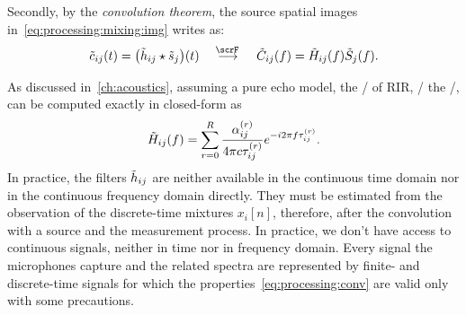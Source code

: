 Secondly, by the \textit{convolution theorem}, the source spatial images in~\cref{eq:processing:mixing:img} writes as:
\begin{equation}\label{eq:processing:conv}
    \tilde{\img}_{\idxMicSrc}( t) =  \kparen{\tilde{\rir}_{\idxMicSrc} \convCont \tilde{\src}_\idxSrc} ( t)
    \mathspace\overset{\fourierTrans{}}{\kto}\mathspace
    \tilde{\IMG}_{\idxMicSrc}( f) =  \tilde{H}_{\idxMicSrc}( f) \tilde{S}_\idxSrc( f)
    .
\end{equation}

\mynewline
As discussed in~\cref{ch:acoustics}, assuming a pure echo model, the \FT/ of \ac{RIR}, \aka/ the \RTFdef/, can be computed exactly in closed-form as
\begin{equation}\label{eq:processing:rir:ft}
    \tilde{H}_{ij}( f) = \sum_{r=0}^{R}
                                 \frac{\alpha_{ij}^{(r)}}{4 \pi c \tau_{ij}^{(r)}}
                                 {e}^{- {i} 2 \pi f \tau_{ij}^{(r)}}
    .
\end{equation}
In practice, the filters $\tilde{h}_{ij}$ are neither available in the continuous time domain nor in the continuous frequency domain directly.
They must be estimated from the observation of the discrete-time mixtures $x_i[n]$, therefore, after the convolution with a source and the measurement process.
In practice, we don't have access to continuous signals, neither in time nor in frequency domain.
Every signal the microphones capture and the related spectra are represented by finite- and discrete-time signals for which the properties~\eqref{eq:processing:conv} are valid only with some precautions.

